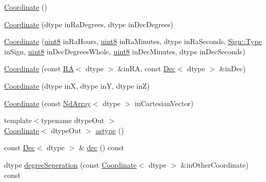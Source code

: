 \begin{DoxyCompactItemize}
\item 
\mbox{\hyperlink{class_num_cpp_1_1_coordinates_1_1_coordinate_acd7f14b8d7baab313c6a195dfce7bae1}{Coordinate}} ()
\item 
\mbox{\hyperlink{class_num_cpp_1_1_coordinates_1_1_coordinate_ac26745663fdd7450516d8ee37237a423}{Coordinate}} (dtype in\+Ra\+Degrees, dtype in\+Dec\+Degrees)
\item 
\mbox{\hyperlink{class_num_cpp_1_1_coordinates_1_1_coordinate_af52fdaf1bc6730e14f5a415464453a80}{Coordinate}} (\mbox{\hyperlink{namespace_num_cpp_aee396d0469d6031cd18118c0a45bcdda}{uint8}} in\+Ra\+Hours, \mbox{\hyperlink{namespace_num_cpp_aee396d0469d6031cd18118c0a45bcdda}{uint8}} in\+Ra\+Minutes, dtype in\+Ra\+Seconds, \mbox{\hyperlink{struct_num_cpp_1_1_coordinates_1_1_sign_a6ef8423d5e83675773c2d4f32490e04b}{Sign\+::\+Type}} in\+Sign, \mbox{\hyperlink{namespace_num_cpp_aee396d0469d6031cd18118c0a45bcdda}{uint8}} in\+Dec\+Degrees\+Whole, \mbox{\hyperlink{namespace_num_cpp_aee396d0469d6031cd18118c0a45bcdda}{uint8}} in\+Dec\+Minutes, dtype in\+Dec\+Seconds)
\item 
\mbox{\hyperlink{class_num_cpp_1_1_coordinates_1_1_coordinate_abf3318419f11eded03ac85832b827ef6}{Coordinate}} (const \mbox{\hyperlink{class_num_cpp_1_1_coordinates_1_1_r_a}{RA}}$<$ dtype $>$ \&in\+RA, const \mbox{\hyperlink{class_num_cpp_1_1_coordinates_1_1_dec}{Dec}}$<$ dtype $>$ \&in\+Dec)
\item 
\mbox{\hyperlink{class_num_cpp_1_1_coordinates_1_1_coordinate_ab8599520ca046b0c97647ffeeec6b80f}{Coordinate}} (dtype inX, dtype inY, dtype inZ)
\item 
\mbox{\hyperlink{class_num_cpp_1_1_coordinates_1_1_coordinate_a93f3a7f7a77b657367a77fdafc7aee73}{Coordinate}} (const \mbox{\hyperlink{class_num_cpp_1_1_nd_array}{Nd\+Array}}$<$ dtype $>$ in\+Cartesian\+Vector)
\item 
{\footnotesize template$<$typename dtype\+Out $>$ }\\\mbox{\hyperlink{class_num_cpp_1_1_coordinates_1_1_coordinate}{Coordinate}}$<$ dtype\+Out $>$ \mbox{\hyperlink{class_num_cpp_1_1_coordinates_1_1_coordinate_a3c39deb9386e4e1d6ed9138ff592660c}{astype}} ()
\item 
const \mbox{\hyperlink{class_num_cpp_1_1_coordinates_1_1_dec}{Dec}}$<$ dtype $>$ \& \mbox{\hyperlink{class_num_cpp_1_1_coordinates_1_1_coordinate_a3366db15458260cfc4f44330d0fc27bc}{dec}} () const
\item 
dtype \mbox{\hyperlink{class_num_cpp_1_1_coordinates_1_1_coordinate_a00a50c0182dc1e7a3bee136055f133aa}{degree\+Seperation}} (const \mbox{\hyperlink{class_num_cpp_1_1_coordinates_1_1_coordinate}{Coordinate}}$<$ dtype $>$ \&in\+Other\+Coordinate) const

\end{DoxyCompactItemize}

